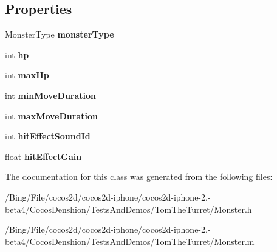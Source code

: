 \subsection*{Properties}
\begin{DoxyCompactItemize}
\item 
\hypertarget{interface_monster_a704869f51592c15e032917903c6bb500}{Monster\-Type {\bfseries monster\-Type}}\label{interface_monster_a704869f51592c15e032917903c6bb500}

\item 
\hypertarget{interface_monster_a8f5512ea0cd543721acb551d3d963486}{int {\bfseries hp}}\label{interface_monster_a8f5512ea0cd543721acb551d3d963486}

\item 
\hypertarget{interface_monster_a770168ad1167b28fdee2425ccbf4b8aa}{int {\bfseries max\-Hp}}\label{interface_monster_a770168ad1167b28fdee2425ccbf4b8aa}

\item 
\hypertarget{interface_monster_a1bb6b0e7fedb2289dc12cd72b18f09ed}{int {\bfseries min\-Move\-Duration}}\label{interface_monster_a1bb6b0e7fedb2289dc12cd72b18f09ed}

\item 
\hypertarget{interface_monster_a045bc88e64ce8f88b1c343b3165965e2}{int {\bfseries max\-Move\-Duration}}\label{interface_monster_a045bc88e64ce8f88b1c343b3165965e2}

\item 
\hypertarget{interface_monster_a3f4fe3aeb4b6d3a157d2cc3630b191fb}{int {\bfseries hit\-Effect\-Sound\-Id}}\label{interface_monster_a3f4fe3aeb4b6d3a157d2cc3630b191fb}

\item 
\hypertarget{interface_monster_aa7e76de3552f5eb6ee19576de0564b12}{float {\bfseries hit\-Effect\-Gain}}\label{interface_monster_aa7e76de3552f5eb6ee19576de0564b12}

\end{DoxyCompactItemize}


The documentation for this class was generated from the following files\-:\begin{DoxyCompactItemize}
\item 
/\-Bing/\-File/cocos2d/cocos2d-\/iphone/cocos2d-\/iphone-\/2.-\/beta4/\-Cocos\-Denshion/\-Tests\-And\-Demos/\-Tom\-The\-Turret/Monster.\-h\item 
/\-Bing/\-File/cocos2d/cocos2d-\/iphone/cocos2d-\/iphone-\/2.-\/beta4/\-Cocos\-Denshion/\-Tests\-And\-Demos/\-Tom\-The\-Turret/Monster.\-m\end{DoxyCompactItemize}
